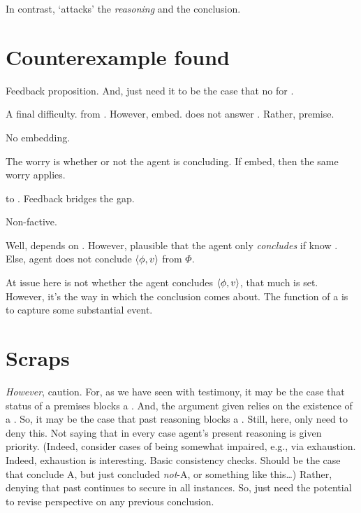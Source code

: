 \begin{note}
  In contrast, \curb{} `attacks' the \emph{reasoning} and the conclusion.
\end{note}

\section{Counterexample found}
\label{sec:counterexample-found}

\begin{note}
  Feedback proposition.
  And, just need it to be the case that no \wit{} for \fc{}.

  A final difficulty.
  \fc{} from \agpe{}.
  However, embed.
  \ros{} does not answer \qWhyVoP{}.
  Rather, premise.

  \begin{proposition}
    No embedding.
    \begin{argument}
      The worry is whether or not the agent is concluding.
      If embed, then the same worry applies.
    \end{argument}
  \end{proposition}
\end{note}

\begin{note}
  \qWhyV{} to \qWhyVnP{}.
  Feedback bridges the gap.
\end{note}

\begin{note}
  Non-factive.

  Well, depends on \requ{}.
  However, plausible that the agent only \emph{concludes} if know \fc{}.
  Else, agent does not conclude \(\langle \phi, v \rangle\) from \(\Phi\).

  At issue here is not whether the agent concludes \(\langle \phi, v \rangle\), that much is set.
  However, it's the way in which the conclusion comes about.
  The function of a \poP{} is to capture some substantial event.
\end{note}


\section{Scraps}
\label{sec:scraps}

\begin{note}
  \emph{However}, caution.
  For, as we have seen with testimony, it may be the case that status of a premises blocks a \curb{}.
  And, the argument given relies on the existence of a \curb{}.
  So, it may be the case that past reasoning blocks a \curb{}.
  Still, here, only need to deny this.
  Not saying that in every case agent's present reasoning is given priority.
  (Indeed, consider cases of being somewhat impaired, e.g., via exhaustion.
  Indeed, exhaustion is interesting.
  Basic consistency checks.
  Should be the case that conclude A, but just concluded \emph{not}-A, or something like this\dots)
  Rather, denying that past continues to secure in all instances.
  So, just need the potential to revise perspective on any previous conclusion.
\end{note}



